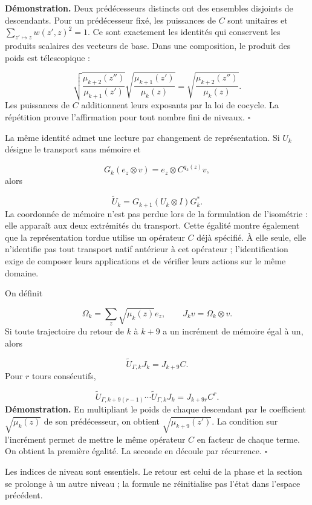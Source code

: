\textbf{Démonstration.} Deux prédécesseurs distincts ont des ensembles disjoints de descendants. Pour un prédécesseur fixé, les puissances de \(C\) sont unitaires et \(\sum_{z'\mapsto z}w(z',z)^2=1\). Ce sont exactement les identités qui conservent les produits scalaires des vecteurs de base. Dans une composition, le produit des poids est télescopique :

\[
\sqrt{\frac{\mu_{k+2}(z'')}{\mu_{k+1}(z')}}
\sqrt{\frac{\mu_{k+1}(z')}{\mu_k(z)}}
=\sqrt{\frac{\mu_{k+2}(z'')}{\mu_k(z)}}.
\]
Les puissances de \(C\) additionnent leurs exposants par la loi de cocycle. La répétition prouve l'affirmation pour tout nombre fini de niveaux. \hfill\(\square\)

La même identité admet une lecture par changement de représentation. Si \(U_k\) désigne le transport sans mémoire et

\[
G_k(e_z\otimes v)=e_z\otimes C^{q_k(z)}v,
\]
alors

\[
\widetilde U_k=G_{k+1}(U_k\otimes I)G_k^*.
\]
La coordonnée de mémoire n'est pas perdue lors de la formulation de l'isométrie : elle apparaît aux deux extrémités du transport. Cette égalité montre également que la représentation tordue utilise un opérateur \(C\) déjà spécifié. À elle seule, elle n'identifie pas tout transport natif antérieur à cet opérateur ; l'identification exige de composer leurs applications et de vérifier leurs actions sur le même domaine.

On définit

\[
\Omega_k=\sum_z\sqrt{\mu_k(z)}e_z,\qquad
J_kv=\Omega_k\otimes v.
\]
Si toute trajectoire du retour de \(k\) à \(k+9\) a un incrément de mémoire égal à un, alors

\[
\widetilde U_{\Gamma,k}J_k=J_{k+9}C.
\]
Pour \(r\) tours consécutifs,

\[
\widetilde U_{\Gamma,k+9(r-1)}\cdots
\widetilde U_{\Gamma,k}J_k=J_{k+9r}C^r.
\]
\textbf{Démonstration.} En multipliant le poids de chaque descendant par le coefficient \(\sqrt{\mu_k(z)}\) de son prédécesseur, on obtient \(\sqrt{\mu_{k+9}(z')}\). La condition sur l'incrément permet de mettre le même opérateur \(C\) en facteur de chaque terme. On obtient la première égalité. La seconde en découle par récurrence. \hfill\(\square\)

Les indices de niveau sont essentiels. Le retour est celui de la phase et la section se prolonge à un autre niveau ; la formule ne réinitialise pas l'état dans l'espace précédent.

